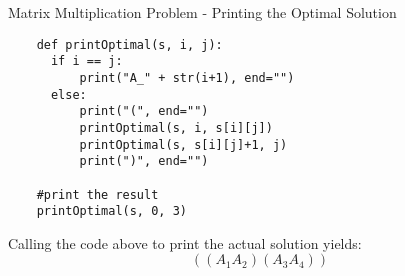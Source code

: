 \begin{frame}[fragile]{Matrix Multiplication Problem - Printing the Optimal Solution}
  \begin{lstlisting}
    def printOptimal(s, i, j):
      if i == j:
          print("A_" + str(i+1), end="")
      else:
          print("(", end="")
          printOptimal(s, i, s[i][j])
          printOptimal(s, s[i][j]+1, j)
          print(")", end="")

    #print the result
    printOptimal(s, 0, 3)
  \end{lstlisting}

  Calling the code above to print the actual solution yields: \\
  \vspace{0.5em}
  \pause 
  \[
   ((A_{1}A_{2})(A_{3}A_{4})) 
  \]
\end{frame}